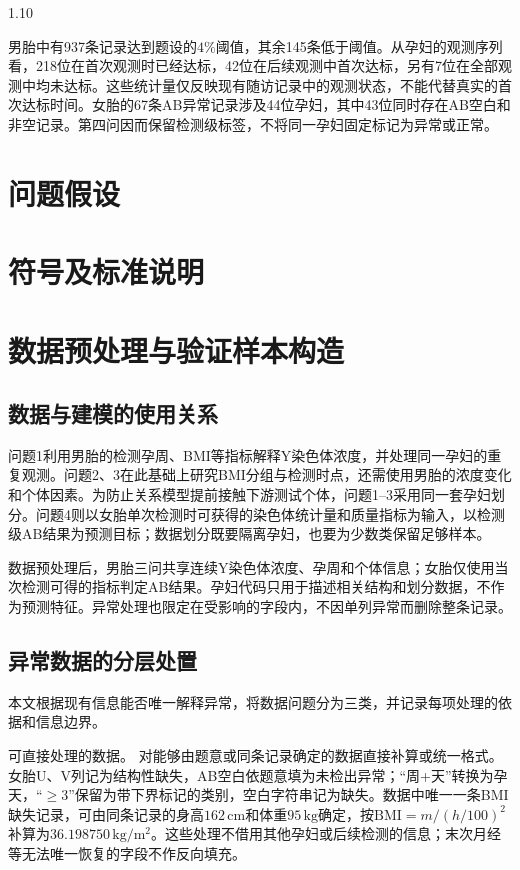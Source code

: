 \documentclass[12pt,a4paper]{ctexrep}
\numberwithin{equation}{section}
\newcommand{\hei}{\heiti}
\begin{document}
\begin{spacing}{1.10}
{			男胎中有937条记录达到题设的$4\%$阈值，其余145条低于阈值。从孕妇的观测序列看，218位在首次观测时已经达标，42位在后续观测中首次达标，另有7位在全部观测中均未达标。这些统计量仅反映现有随访记录中的观测状态，不能代替真实的首次达标时间。女胎的67条AB异常记录涉及44位孕妇，其中43位同时存在AB空白和非空记录。第四问因而保留检测级标签，不将同一孕妇固定标记为异常或正常。

			\section{问题假设}
			
			\section{符号及标准说明}
			
		\newpage
			\section{数据预处理与验证样本构造}
			\subsection{数据与建模的使用关系}

			问题1利用男胎的检测孕周、BMI等指标解释Y染色体浓度，并处理同一孕妇的重复观测。问题2、3在此基础上研究BMI分组与检测时点，还需使用男胎的浓度变化和个体因素。为防止关系模型提前接触下游测试个体，问题1--3采用同一套孕妇划分。问题4则以女胎单次检测时可获得的染色体统计量和质量指标为输入，以检测级AB结果为预测目标；数据划分既要隔离孕妇，也要为少数类保留足够样本。

			数据预处理后，男胎三问共享连续Y染色体浓度、孕周和个体信息；女胎仅使用当次检测可得的指标判定AB结果。孕妇代码只用于描述相关结构和划分数据，不作为预测特征。异常处理也限定在受影响的字段内，不因单列异常而删除整条记录。

			\subsection{异常数据的分层处置}

			本文根据现有信息能否唯一解释异常，将数据问题分为三类，并记录每项处理的依据和信息边界。

			{\hei 可直接处理的数据。} 对能够由题意或同条记录确定的数据直接补算或统一格式。女胎U、V列记为结构性缺失，AB空白依题意填为未检出异常；“周+天”转换为孕天，“$\geq3$”保留为带下界标记的类别，空白字符串记为缺失。数据中唯一一条BMI缺失记录，可由同条记录的身高$162\,\mathrm{cm}$和体重$95\,\mathrm{kg}$确定，按$\mathrm{BMI}=m/(h/100)^2$补算为$36.198750\,\mathrm{kg/m^2}$。这些处理不借用其他孕妇或后续检测的信息；末次月经等无法唯一恢复的字段不作反向填充。

}
\end{spacing}
\end{document}
